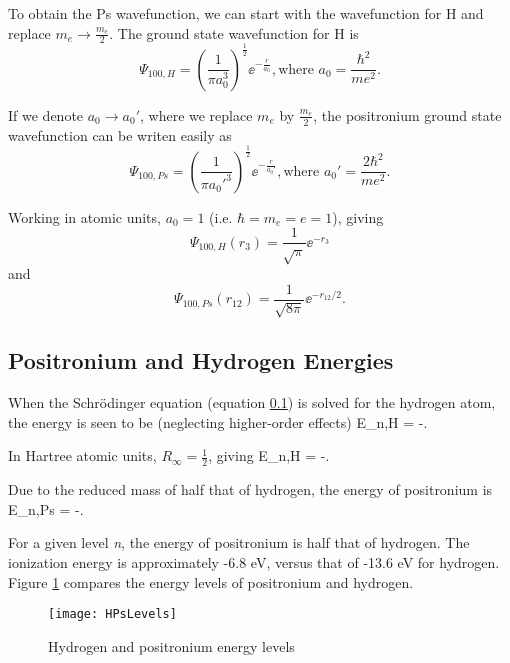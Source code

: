 \documentclass[Introduction.tex]{subfiles}
\begin{document}
To obtain the Ps wavefunction, we can start with the wavefunction for H and replace $m_e \rightarrow \frac{m_e}{2}$.  The ground state wavefunction for H is
\begin{equation}
\Psi_{100,H} = \left(\frac{1}{\pi a_0^3}\right)^{\frac{1}{2}} \!\! \ee^{-\frac{r}{a_0}},
\text{where } a_0 = \frac{\hbar^2}{m e^2}.
\end{equation}

If we denote $a_0 \rightarrow a_0'$, where we replace $m_e$ by $\frac{m_e}{2}$, the positronium ground state wavefunction can be writen easily as
\begin{equation}
\Psi_{100,Ps} = \left(\frac{1}{\pi {a_0'}^3}\right)^{\frac{1}{2}} \!\! \ee^{-\frac{r}{a_0'}},
\text{where } a_0' = \frac{2\hbar^2}{m e^2}.
\end{equation}

Working in atomic units, $a_0 = 1$ (i.e. $\hbar = m_e = e = 1$), giving
\begin{equation}
\Psi_{100,H}\left(r_3\right) = \frac{1}{\sqrt{\pi}} \ee^{-r_3}
\label{eq:HWave}
\end{equation}
and
\begin{equation}
\Psi_{100,Ps}\left(r_{12}\right) = \frac{1}{\sqrt{8 \pi}} \ee^{-r_{12}/2}.
\label{eq:PsWave}
\end{equation}

\subsection{Positronium and Hydrogen Energies}

When the Schr\"{o}dinger equation (equation \ref{}) is solved for the hydrogen atom, the energy is seen to be (neglecting higher-order effects)
\beq
\label{eq:HEnergy}
E_{n,H} = -.
\eeq

\noindent In Hartree atomic units, $R_\infty = \frac{1}{2}$, giving
\beq
\label{eq:HEnergyAU}
E_{n,H} = -.
\eeq

\noindent Due to the reduced mass of half that of hydrogen, the energy of positronium is
\beq
\label{eq:PsEnergyAU}
E_{n,Ps} = -.
\eeq

\noindent For a given level \emph{n}, the energy of positronium is half that of hydrogen.  The ionization energy is approximately -6.8 eV, versus that of -13.6 eV for hydrogen.  Figure \ref{fig:HPsLevels} compares the energy levels of positronium and hydrogen.

\begin{figure}[H]
	\centering
	\texttt{[image: HPsLevels]}
	\caption{Hydrogen and positronium energy levels}
	\label{fig:HPsLevels}
\end{figure}
\end{document}
